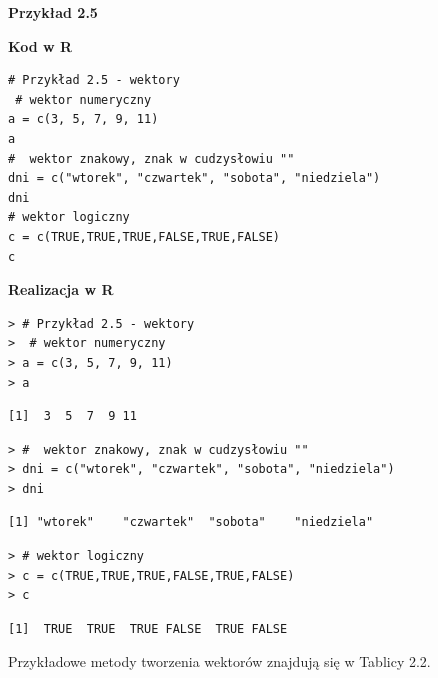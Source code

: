 \documentclass[12pt,B5paper,]{book}
\begin{document}
\vspace{0.8cm}

\textbf{Przykład 2.5}

\textbf{Kod w R}

\begin{verbatim}
# Przykład 2.5 - wektory
 # wektor numeryczny
a = c(3, 5, 7, 9, 11) 
a
#  wektor znakowy, znak w cudzysłowiu ""
dni = c("wtorek", "czwartek", "sobota", "niedziela")  
dni
# wektor logiczny
c = c(TRUE,TRUE,TRUE,FALSE,TRUE,FALSE) 
c
\end{verbatim}

\vspace{0.8cm}

\textbf{Realizacja w R}

\begin{verbatim}
> # Przykład 2.5 - wektory
>  # wektor numeryczny
> a = c(3, 5, 7, 9, 11) 
> a
\end{verbatim}

\begin{verbatim}
[1]  3  5  7  9 11
\end{verbatim}

\begin{verbatim}
> #  wektor znakowy, znak w cudzysłowiu ""
> dni = c("wtorek", "czwartek", "sobota", "niedziela")  
> dni
\end{verbatim}

\begin{verbatim}
[1] "wtorek"    "czwartek"  "sobota"    "niedziela"
\end{verbatim}

\begin{verbatim}
> # wektor logiczny
> c = c(TRUE,TRUE,TRUE,FALSE,TRUE,FALSE) 
> c
\end{verbatim}

\begin{verbatim}
[1]  TRUE  TRUE  TRUE FALSE  TRUE FALSE
\end{verbatim}

Przykładowe metody tworzenia wektorów znajdują się w Tablicy 2.2.
\end{document}
